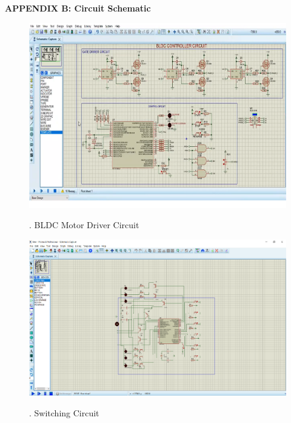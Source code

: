 \documentclass[a4paper,12pt]{article}
\begin{document}
\begin{center}
\LARGE\textbf{APPENDIX B:  Circuit Schematic}
\end{center}

\begin{figure}[!h]
\centering
\includegraphics[scale=0.4]{ckt.png}\\
\caption{. BLDC Motor Driver Circuit}
\end{figure}

\begin{figure}[!h]
\centering
\includegraphics[scale=0.5]{swckt.png}\\
\caption{. Switching Circuit}
\end{figure}
\end{document}
